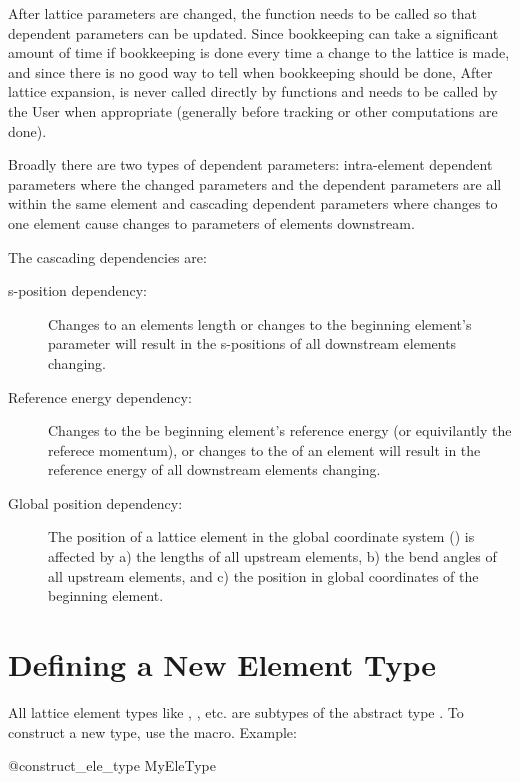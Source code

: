 After lattice parameters are changed, the function  needs to be called
so that dependent parameters can be updated. 
Since bookkeeping can take a significant amount of time if bookkeeping is done every time
a change to the lattice is made, and since there is no good way to tell when bookkeeping should
be done, After lattice expansion,  is never called directly by \accellat 
functions and needs to be called by the User when appropriate (generally before tracking or
other computations are done).

Broadly there are two types of dependent parameters: intra-element dependent parameters where
the changed parameters and the dependent parameters are all within the same element and
cascading dependent parameters where changes to one element cause changes to parameters of 
elements downstream.

The cascading dependencies are:
\begin{description}
%
\item [s-position dependency:]
Changes to an elements length  or changes to the beginning element's  parameter will
result in the s-positions of all downstream elements changing.
%
\item [Reference energy dependency:] Changes to the be beginning element's reference energy (or
equivilantly the referece momentum), or changes to the  of an  element
will result in the reference energy of all downstream elements changing.
%
\item[Global position dependency:]
The position of a lattice element in the global coordinate system () is affected
by a) the lengths of all upstream elements, b) the bend angles of all upstream elements, and c)
the position in global coordinates of the beginning element.
\end{description}


\section{Defining a New Element Type}
\label{s:ele.type}

All lattice element types like , , etc. are subtypes of the abstract type
. To construct a new type, use the  macro. Example:
\begin{example}
  @construct_ele_type MyEleType
\end{example}

